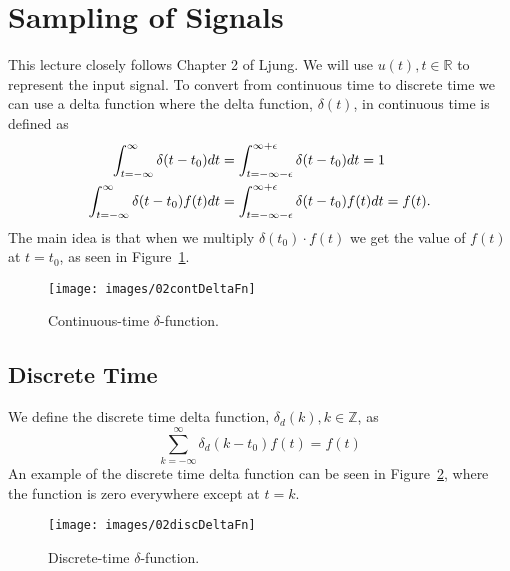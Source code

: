 \mainmatter%
\setcounter{page}{1}

\lectureseries[\course]{\course}

\date{September 29, 2009}

\setaddress%

\setcounter{lecture}{1}
\setcounter{chapter}{1}


\section{Sampling of Signals}
This lecture closely follows Chapter 2 of Ljung.
We will use $u(t), t \in \mathbb{R}$ to represent the input signal.
To convert from continuous time to discrete time we can use a delta function where the delta function, $\delta (t)$, in continuous time is defined as
\begin{align*}
\int_{t=-\infty}^\infty \delta(t-t_0)dt &= \int_{t=-\infty-\epsilon}^{\infty+\epsilon} \delta(t-t_0)dt = 1 \\
\int_{t=-\infty}^\infty \delta(t-t_0)f(t)dt &= \int_{t=-\infty-\epsilon}^{\infty+\epsilon} \delta(t-t_0)f(t)dt = f(t).
\end{align*}
The main idea is that when we multiply $\delta(t_0) \cdot f(t)$ we get the value of $f(t)$ at $t=t_0$, as seen in Figure~\ref{fig:02contDeltaFn}.
\begin{figure}[ht!]
\centering
\texttt{[image: images/02contDeltaFn]}
\caption{Continuous-time $\delta$-function.}
\label{fig:02contDeltaFn}
\end{figure}

\subsection{Discrete Time}
We define the discrete time delta function, $\delta_d(k), k \in \mathbb{Z}$, as
$$\sum_{k=-\infty}^\infty \delta_d(k-t_0)f(t) = f(t)$$
An example of the discrete time delta function can be seen in Figure~\ref{fig:02discDeltaFn}, where the function is zero everywhere except at $t=k$.
\begin{figure}[ht!]
\centering
\texttt{[image: images/02discDeltaFn]}
\caption{Discrete-time $\delta$-function.}
\label{fig:02discDeltaFn}
\end{figure}

